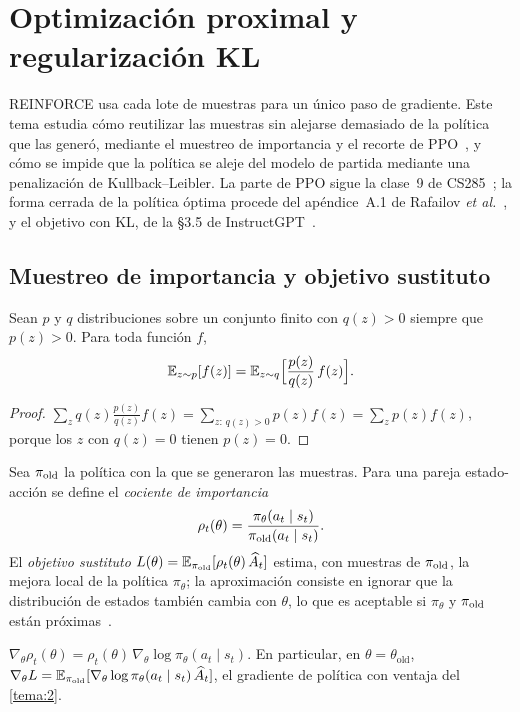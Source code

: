 \chapter{Optimización proximal y regularización KL}
\label{tema:3}

REINFORCE usa cada lote de muestras para un único paso de gradiente. Este tema estudia cómo reutilizar las muestras sin alejarse demasiado de la política que las generó, mediante el muestreo de importancia y el recorte de PPO~\cite{ppo}, y cómo se impide que la política se aleje del modelo de partida mediante una penalización de Kullback--Leibler. La parte de PPO sigue la clase~9 de CS285~\cite{cs285}; la forma cerrada de la política óptima procede del apéndice~A.1 de Rafailov \emph{et al.}~\cite{dpo}, y el objetivo con KL, de la §3.5 de InstructGPT~\cite{instructgpt}.

\section{Muestreo de importancia y objetivo sustituto}

\begin{proposicion}\label{prop:is}
Sean $p$ y $q$ distribuciones sobre un conjunto finito con $q(z)>0$ siempre que $p(z)>0$. Para toda función $f$,
\[
\mathbb{E}_{z\sim p}[f(z)]=\mathbb{E}_{z\sim q}\Bigl[\frac{p(z)}{q(z)}\,f(z)\Bigr].
\]
\end{proposicion}

\begin{proof}
$\sum_z q(z)\frac{p(z)}{q(z)}f(z)=\sum_{z:\,q(z)>0}p(z)f(z)=\sum_z p(z)f(z)$, porque los $z$ con $q(z)=0$ tienen $p(z)=0$.
\end{proof}

Sea $\pi_{\mathrm{old}}$ la política con la que se generaron las muestras. Para una pareja estado-acción se define el \emph{cociente de importancia}
\[
\rho_t(\theta)=\frac{\pi_\theta(a_t\mid s_t)}{\pi_{\mathrm{old}}(a_t\mid s_t)}.
\]
El \emph{objetivo sustituto} $L(\theta)=\mathbb{E}_{\pi_{\mathrm{old}}}[\rho_t(\theta)\,\widehat A_t]$ estima, con muestras de $\pi_{\mathrm{old}}$, la mejora local de la política $\pi_\theta$; la aproximación consiste en ignorar que la distribución de estados también cambia con $\theta$, lo que es aceptable si $\pi_\theta$ y $\pi_{\mathrm{old}}$ están próximas~\cite{cs285}.

\begin{proposicion}\label{prop:sustituto}
$\nabla_\theta\rho_t(\theta)=\rho_t(\theta)\,\nabla_\theta\log\pi_\theta(a_t\mid s_t)$. En particular, en $\theta=\theta_{\mathrm{old}}$, $\nabla_\theta L=\mathbb{E}_{\pi_{\mathrm{old}}}[\nabla_\theta\log\pi_\theta(a_t\mid s_t)\,\widehat A_t]$, el gradiente de política con ventaja del \cref{tema:2}.
\end{proposicion}


